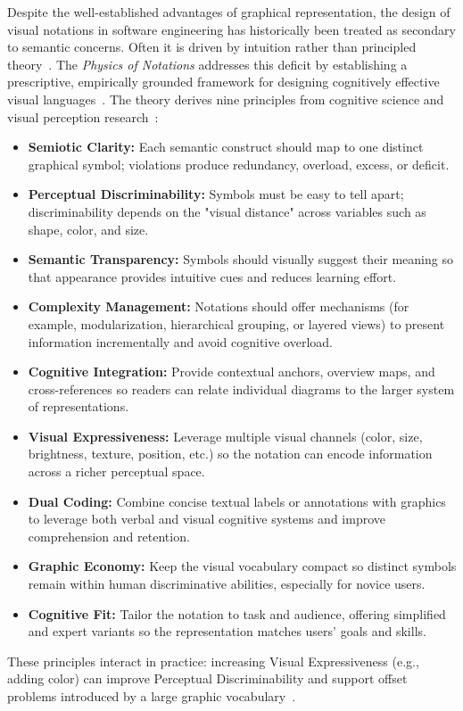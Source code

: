 Despite the well-established advantages of graphical representation, the design of visual notations in software engineering has historically been treated as secondary to semantic concerns.
Often it is driven by intuition rather than principled theory~\cite{moody_physics_2009}.
The \textit{Physics of Notations} addresses this deficit by establishing a prescriptive, empirically grounded framework for designing cognitively effective visual languages~\cite{moody_physics_2009}.
The theory derives nine principles from cognitive science and visual perception research~\cite{moody_physics_2009}:
\begin{itemize}
	\item \textbf{Semiotic Clarity:} Each semantic construct should map to one distinct graphical symbol; violations produce redundancy, overload, excess, or deficit.
	\item \textbf{Perceptual Discriminability:} Symbols must be easy to tell apart; discriminability depends on the "visual distance" across variables such as shape, color, and size.
	\item \textbf{Semantic Transparency:} Symbols should visually suggest their meaning so that appearance provides intuitive cues and reduces learning effort.
	\item \textbf{Complexity Management:} Notations should offer mechanisms (for example, modularization, hierarchical grouping, or layered views) to present information incrementally and avoid cognitive overload.
	\item \textbf{Cognitive Integration:} Provide contextual anchors, overview maps, and cross-references so readers can relate individual diagrams to the larger system of representations.
	\item \textbf{Visual Expressiveness:} Leverage multiple visual channels (color, size, brightness, texture, position, etc.) so the notation can encode information across a richer perceptual space.
	\item \textbf{Dual Coding:} Combine concise textual labels or annotations with graphics to leverage both verbal and visual cognitive systems and improve comprehension and retention.
	\item \textbf{Graphic Economy:} Keep the visual vocabulary compact so distinct symbols remain within human discriminative abilities, especially for novice users.
	\item \textbf{Cognitive Fit:} Tailor the notation to task and audience, offering simplified and expert variants so the representation matches users' goals and skills.
\end{itemize}

These principles interact in practice: increasing Visual Expressiveness (e.g., adding color) can improve Perceptual Discriminability and support offset problems introduced by a large graphic vocabulary~\cite{moody_physics_2009}.